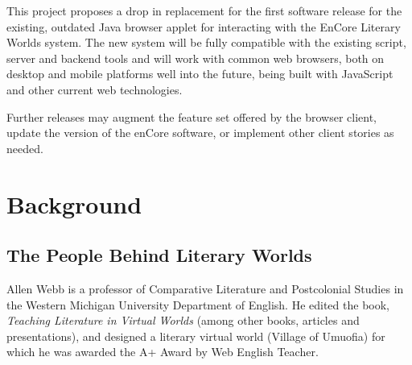 \documentclass[12pt, letterpaper]{report}
\begin{document}
\par
This project proposes a drop in replacement for the first software release for the existing, outdated Java browser applet for interacting with the EnCore Literary Worlds system. The new system will be fully compatible with the existing script, server and backend tools and will work with common web browsers, both on desktop and mobile platforms well into the future, being built with JavaScript and other current web technologies.



\par
Further releases may augment the feature set offered by the browser client, update the version of the enCore software, or implement other client stories as needed.

	
\tableofcontents

%

\chapter{Background}

\section{The People Behind Literary Worlds}
\par
Allen Webb is a professor of Comparative Literature and Postcolonial Studies in the Western Michigan University Department of English. He edited the book, \textit{Teaching Literature in Virtual Worlds} (among other books, articles and presentations), and designed a literary virtual world (Village of Umuofia) for which he was awarded the A+ Award by Web English Teacher.
\end{document}
